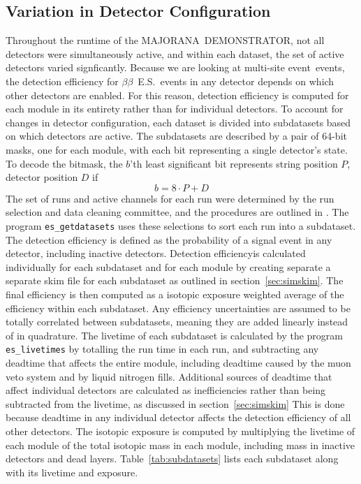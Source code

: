 \documentclass[notitlepage,rmp,aps,10pt]{revtex4-1}
\newcommand{\MJ}{M{\footnotesize AJORANA}}
\newcommand{\Demo}{D{\footnotesize EMON\-STRAT\-OR}}
\newcommand{\MJD}{\MJ\ \Demo}
\newcommand{\bb}{${\beta \beta}$}
\newcommand{\bbes}{\bb~E.S.}
\newcommand{\msmd}{multi-site event}
\begin{document}
\subsection{Variation in Detector Configuration} \label{sec:sds}
Throughout the runtime of the \MJD, not all detectors were simultaneously active, and within each dataset, the set of active detectors varied signficantly.
Because we are looking at \msmd\ events, the detection efficiency for \bbes\ events in any detector depends on which other detectors are enabled.
For this reason, detection efficiency is computed for each module in its entirety rather than for individual detectors.
To account for changes in detector configuration, each dataset is divided into subdatasets based on which detectors are active.
The subdatasets are described by a pair of 64-bit masks, one for each module, with each bit representing a single detector's state.
To decode the bitmask, the $b$'th least significant bit represents string position $P$, detector position $D$ if
\begin{equation}\label{eq:sdsbitmask}
  b = 8\cdot P + D
\end{equation}
The set of runs and active channels for each run were determined by the run selection and data cleaning committee, and the procedures are outlined in \cite{2018Reine}.
The program \texttt{es\_getdatasets} uses these selections to sort each run into a subdataset.
\\
The detection efficiency is defined as the probability of a signal event in any detector, including inactive detectors.
Detection efficiencyis calculated individually for each subdataset and for each module by creating separate a separate skim file for each subdataset as outlined in section~\ref{sec:simskim}.
The final efficiency is then computed as a isotopic exposure weighted average of the efficiency within each subdataset.
Any efficiency uncertainties are assumed to be totally correlated between subdatasets, meaning they are added linearly instead of in quadrature.
The livetime of each subdataset is calculated by the program \texttt{es\_livetimes} by totalling the run time in each run, and subtracting any deadtime that affects the entire module, including deadtime caused by the muon veto system and by liquid nitrogen fills.
Additional sources of deadtime that affect individual detectors are calculated as inefficiencies rather than being subtracted from the livetime, as discussed in section~\ref{sec:simskim}
This is done because deadtime in any individual detector affects the detection efficiency of all other detectors.
The isotopic exposure is computed by multiplying the livetime of each module of the total isotopic mass in each module, including mass in inactive detectors and dead layers.
Table~\ref{tab:subdatasets} lists each subdataset along with its livetime and exposure.
\end{document}
